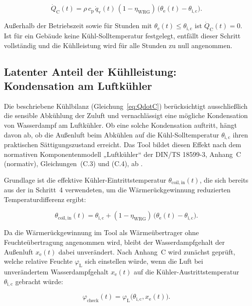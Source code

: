 \documentclass{scrreprt}
\begin{document}
\begin{equation}\label{eq:QdotC}
    \dot Q_{\mathrm{C}}(t) = \rho \, c_{\mathrm{p}} \, \dot q_{\mathrm{v}}(t) \, (1-\eta_{\mathrm{WRG}}) \, \bigl(\theta_{\mathrm{e}}(t) - \theta_{\mathrm{i,c}}\bigr).
\end{equation}

Außerhalb der Betriebszeit sowie für Stunden mit
$\theta_{\mathrm{e}}(t) \leq \theta_{\mathrm{i,c}}$ ist $\dot
Q_{\mathrm{C}}(t) = 0$. Ist für ein Gebäude keine Kühl-Solltemperatur
festgelegt, entfällt dieser Schritt vollständig und die Kühlleistung
wird für alle Stunden zu null angenommen.

\subsection{Latenter Anteil der Kühlleistung: Kondensation am Luftkühler}
Die beschriebene Kühlbilanz (Gleichung~\eqref{eq:QdotC})
berücksichtigt ausschließlich die sensible Abkühlung der Zuluft und
vernachlässigt eine mögliche Kondensation von Wasserdampf am
Luftkühler. Ob eine solche Kondensation auftritt, hängt davon ab, ob
die Außenluft beim Abkühlen auf die Kühl-Solltemperatur
$\theta_{\mathrm{i,c}}$ ihren praktischen Sättigungszustand erreicht.
Das Tool bildet diesen Effekt nach dem normativen Komponentenmodell
„Luftkühler“ der DIN/TS 18599-3, Anhang~C (normativ),
Gleichungen~(C.3) und (C.4), ab \parencite{DIN185993}.

Grundlage ist die effektive Kühler-Eintrittstemperatur
$\theta_{\mathrm{coil,in}}(t)$, die sich bereits aus der in Schritt~4
verwendeten, um die Wärmerückgewinnung reduzierten
Temperaturdifferenz ergibt:

\begin{equation}\label{eq:thetacoilin}
    \theta_{\mathrm{coil,in}}(t) = \theta_{\mathrm{i,c}} + (1-\eta_{\mathrm{WRG}}) \, \bigl(\theta_{\mathrm{e}}(t) - \theta_{\mathrm{i,c}}\bigr).
\end{equation}

Da die Wärmerückgewinnung im Tool als Wärmeübertrager ohne
Feuchteübertragung angenommen wird, bleibt der Wasserdampfgehalt der
Außenluft $x_{\mathrm{e}}(t)$ dabei unverändert. Nach Anhang~C wird
zunächst geprüft, welche relative Feuchte $\varphi_{\mathrm{L}}$ sich
einstellen würde, wenn die Luft bei unverändertem Wasserdampfgehalt
$x_{\mathrm{e}}(t)$ auf die Kühler-Austrittstemperatur
$\theta_{\mathrm{i,c}}$ gebracht würde:

\begin{equation}\label{eq:phicheck}
    \varphi_{\mathrm{check}}(t) = \varphi_{\mathrm{L}}\bigl(\theta_{\mathrm{i,c}}, x_{\mathrm{e}}(t)\bigr).
\end{equation}
\end{document}
